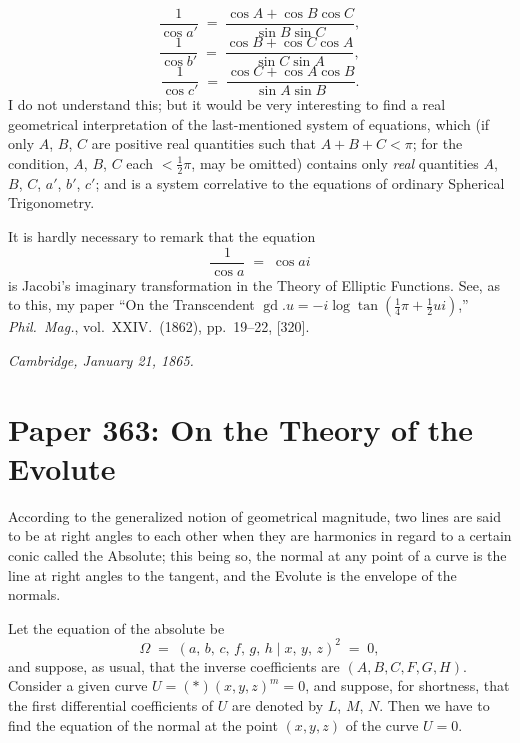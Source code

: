 \documentclass[11pt]{article}
\begin{document}
\[
\frac{1}{\cos a'} \;=\; \frac{\cos A + \cos B \cos C}{\sin B \sin C},
\]
\[
\frac{1}{\cos b'} \;=\; \frac{\cos B + \cos C \cos A}{\sin C \sin A},
\]
\[
\frac{1}{\cos c'} \;=\; \frac{\cos C + \cos A \cos B}{\sin A \sin B}.
\]
I do not understand this; but it would be very interesting to find a real geometrical interpretation of the last-mentioned system of equations, which (if only $A$, $B$, $C$ are positive real quantities such that $A + B + C < \pi$; for the condition, $A$, $B$, $C$ each $< \tfrac{1}{2}\pi$, may be omitted) contains only \textit{real} quantities $A$, $B$, $C$, $a'$, $b'$, $c'$; and is a system correlative to the equations of ordinary Spherical Trigonometry.

It is hardly necessary to remark that the equation
\[
\frac{1}{\cos a} \;=\; \cos a i
\]
is Jacobi's imaginary transformation in the Theory of Elliptic Functions. See, as to this, my paper ``On the Transcendent $\operatorname{gd}.u = -i\log\tan(\tfrac{1}{4}\pi + \tfrac{1}{2} u i)$,'' \textit{Phil.\ Mag.}, vol.\ XXIV.\ (1862), pp.\ 19--22, [320].

\medskip
\textit{Cambridge, January 21, 1865.}

\bigskip
\section*{Paper 363: On the Theory of the Evolute}

\medskip{}

\medskip

According to the generalized notion of geometrical magnitude, two lines are said to be at right angles to each other when they are harmonics in regard to a certain conic called the Absolute; this being so, the normal at any point of a curve is the line at right angles to the tangent, and the Evolute is the envelope of the normals.

Let the equation of the absolute be
\[
\Omega \;=\; (a,\,b,\,c,\,f,\,g,\,h \mid x,\,y,\,z)^{2} \;=\; 0,
\]
and suppose, as usual, that the inverse coefficients are $(A, B, C, F, G, H)$. Consider a given curve $U = (*)(x, y, z)^{m} = 0$, and suppose, for shortness, that the first differential coefficients of $U$ are denoted by $L$, $M$, $N$. Then we have to find the equation of the normal at the point $(x, y, z)$ of the curve $U = 0$.
\end{document}
